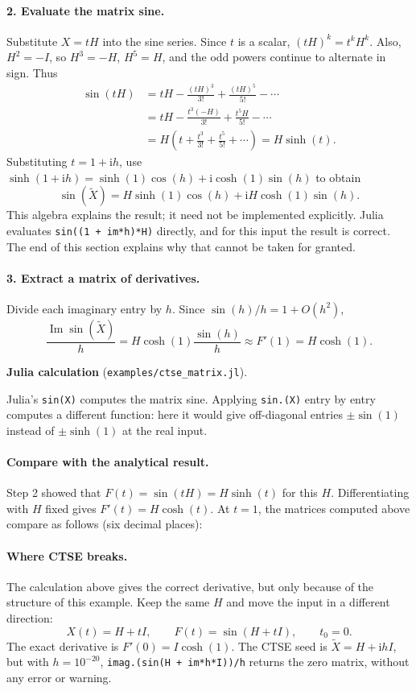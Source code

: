\documentclass[11pt]{article}
\newcommand{\ii}{\mathrm i}
\newcommand{\juliascript}[1]{\par\medskip\needspace{6\baselineskip}\noindent
  \textbf{Julia calculation} (\nolinkurl{examples/#1}).\par
  }
\begin{document}
\paragraph{2. Evaluate the matrix sine.}
Substitute $X=tH$ into the sine series. Since $t$ is a scalar,
$(tH)^k=t^kH^k$. Also, $H^2=-I$, so $H^3=-H$, $H^5=H$,
and the odd powers continue to alternate in sign. Thus
\begin{align*}
 \sin(tH)
 &=tH-\frac{(tH)^3}{3!}+\frac{(tH)^5}{5!}-\cdots\\
 &=tH-\frac{t^3(-H)}{3!}+\frac{t^5H}{5!}-\cdots\\
 &=H\left(t+\frac{t^3}{3!}+\frac{t^5}{5!}+\cdots\right)
 =H\sinh(t).
\end{align*}
Substituting $t=1+\ii h$, use
$\sinh(1+\ii h)=\sinh(1)\cos(h)+\ii\cosh(1)\sin(h)$ to obtain
\[
 \sin(\widetilde X)=H\sinh(1)\cos(h)+\ii H\cosh(1)\sin(h).
\]
This algebra explains the result; it need not be implemented explicitly.
Julia evaluates \texttt{sin((1 + im*h)*H)} directly, and for this input the
result is correct. The end of this section explains why that cannot be taken
for granted.

\paragraph{3. Extract a matrix of derivatives.}
Divide each imaginary entry by $h$. Since $\sin(h)/h=1+O(h^2)$,
\[
 \boxed{\frac{\operatorname{Im}\sin(\widetilde X)}{h}
 =H\cosh(1)\frac{\sin(h)}{h}\approx F'(1)=H\cosh(1).}
\]
\juliascript{ctse_matrix.jl}
Julia's \texttt{sin(X)} computes the matrix sine. Applying \texttt{sin.(X)}
entry by entry computes a different function: here it would give off-diagonal
entries $\pm\sin(1)$ instead of $\pm\sinh(1)$ at the real input.

\paragraph{Compare with the analytical result.}
Step 2 showed that $F(t)=\sin(tH)=H\sinh(t)$ for this $H$. Differentiating
with $H$ fixed gives $F'(t)=H\cosh(t)$. At $t=1$, the matrices computed above
compare as follows (six decimal places):
%

\paragraph{Where CTSE breaks.}
The calculation above gives the correct derivative, but only because of the
structure of this example. Keep the same $H$ and move the input in a
different direction:
\[
 X(t)=H+tI,\qquad F(t)=\sin(H+tI),\qquad t_0=0.
\]
The exact derivative is $F'(0)=I\cosh(1)$. The CTSE seed is
$\widetilde X=H+\ii hI$, but with $h=10^{-20}$,
\texttt{imag.(sin(H + im*h*I))/h} returns the zero matrix, without any error
or warning.
\end{document}
